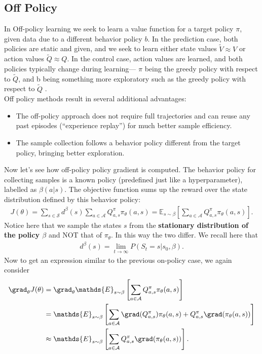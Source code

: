 \subsection{Off Policy}
In Off-policy learning we seek to learn a value function for a target policy $\pi$, given data due to a different behavior policy $b$. In the prediction case, both policies are static and given, and we seek to learn either state values $\tilde{V}\approx V $ or action values $\tilde{Q} \approx Q$. In the control case, action values are learned, and both policies typically change during learning— $\pi$ being the greedy policy with respect to $\tilde{Q}$, and b being something
more exploratory such as the greedy policy with respect to $\tilde{Q}$ \cite{Sutton:Intro_to_RL_second_ed}.\\
Off policy methods result in several additional advantages\cite{lilianwengPolicyGradient}:
\begin{itemize}
    \item The off-policy approach does not require full trajectories and can reuse any past episodes (“experience replay”) for much better sample efficiency.
    \item The sample collection follows a behavior policy different from the target policy, bringing better exploration.
\end{itemize}
Now let's see how off-policy policy gradient is computed. The behavior policy for collecting samples is a known policy (predefined just like a hyperparameter), labelled as $\beta(a|s)$. The objective function sums up the reward over the state distribution defined by this behavior policy:
\begin{align}
    J(\theta) = \sum_{s\in \mathcal{S}} d^{\beta}(s) \sum_{a\in \mathcal{A}} Q^{\pi}_{a,s} \pi_{\theta}(a,s)=\mathds{E}_{s\sim\beta}\left[\sum_{a\in\mathcal{A}}Q^{\pi}_{a,s} \pi_{\theta}(a,s)\right ].
\end{align}
Notice here that we sample the states $s$ from the \textbf{stationary distribution of the policy $\beta$} and NOT that of $\pi_{\theta}$. In this way the two differ. We recall here that 
\begin{align}
    d^{\beta}(s) = \lim_{t\rightarrow \infty} P(S_t=s|s_0,\beta).
\end{align}
Now to get an expression similar to the previous on-policy case, we again consider 
\begin{align}
    \grad_{\theta}J(\theta) &= \grad_{\theta} \mathds{E}_{s\sim\beta}\left[\sum_{a\in\mathcal{A}}Q^{\pi}_{a,s} \pi_{\theta}(a,s)\right ]\\
    &=\mathds{E}_{s\sim\beta}\left[\sum_{a\in\mathcal{A}}\grad (Q^{\pi}_{a,s}) \pi_{\theta}(a,s) +  Q^{\pi}_{a,s} \grad(\pi_{\theta}(a,s))\right ]\\
    &\approx \mathds{E}_{s\sim\beta}\left[\sum_{a\in\mathcal{A}}  Q^{\pi}_{a,s} \grad(\pi_{\theta}(a,s))\right ].
\end{align}
